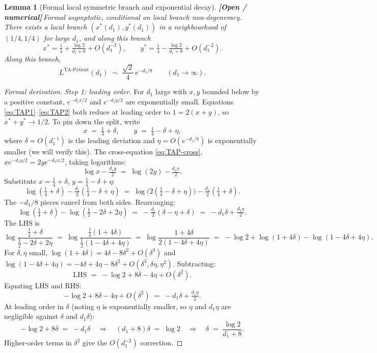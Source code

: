 \documentclass{article}
\theoremstyle{plain}
\newtheorem{lemma}{Lemma}
\theoremstyle{definition}
\newcommand{\open}{\textcolor{openred}{\textbf{[Open / numerical]}}\,}
\begin{document}
\begin{lemma}[Formal local symmetric branch and exponential decay]\label{lem:TAP}
\open Formal asymptotic, conditional on local branch non-degeneracy. There exists a local branch $(x^\ast(d_1),y^\ast(d_1))$ in a neighbourhood of $(1/4,1/4)$ for large $d_1$, and along this branch
\[
x^\ast=\tfrac14+\tfrac{\log 2}{d_1+8}+O(d_1^{-2}),\qquad y^\ast=\tfrac14-\tfrac{\log 2}{d_1+8}+O(d_1^{-2}).
\]
Along this branch,
\[
L^{\text{TA-Patient}}(d_1) \;\sim\; \frac{\sqrt 2}{4}\,e^{-d_1/8}\qquad(d_1\to\infty).
\]
\end{lemma}

\begin{proof}[Formal derivation]
\emph{Step 1: leading order.} For $d_1$ large with $x,y$ bounded below by a positive constant, $e^{-d_1 x/2}$ and $e^{-d_1 y/2}$ are exponentially small. Equations \eqref{eq:TAP1}--\eqref{eq:TAP2} both reduce at leading order to $1=2(x+y)$, so $x^\ast+y^\ast\to 1/2$. To pin down the split, write
\[
x\;=\;\tfrac14+\delta,\qquad y\;=\;\tfrac14-\delta+\eta,
\]
where $\delta=O(d_1^{-1})$ is the leading deviation and $\eta=O(e^{-d_1/8})$ is exponentially smaller (we will verify this). The cross-equation \eqref{eq:TAP-cross}, $x e^{-d_1 y/2}=2y e^{-d_1 x/2}$, taking logarithms:
\[
\log x-\tfrac{d_1 y}{2}\;=\;\log(2y)-\tfrac{d_1 x}{2}.
\]
Substitute $x=\tfrac14+\delta$, $y=\tfrac14-\delta+\eta$:
\[
\log(\tfrac14+\delta)-\tfrac{d_1}{2}(\tfrac14-\delta+\eta)\;=\;\log\bigl(2(\tfrac14-\delta+\eta)\bigr)-\tfrac{d_1}{2}(\tfrac14+\delta).
\]
The $-d_1/8$ pieces cancel from both sides. Rearranging:
\[
\log(\tfrac14+\delta)-\log(\tfrac12-2\delta+2\eta)\;=\;-\tfrac{d_1}{2}(\delta-\eta+\delta)\;=\;-d_1\delta+\tfrac{d_1\eta}{2}.
\]
The LHS is
\[
\log\!\frac{\tfrac14+\delta}{\tfrac12-2\delta+2\eta}\;=\;\log\!\frac{\tfrac14(1+4\delta)}{\tfrac12(1-4\delta+4\eta)}\;=\;\log\!\frac{1+4\delta}{2(1-4\delta+4\eta)}\;=\;-\log 2+\log(1+4\delta)-\log(1-4\delta+4\eta).
\]
For $\delta,\eta$ small, $\log(1+4\delta)=4\delta-8\delta^2+O(\delta^3)$ and $\log(1-4\delta+4\eta)=-4\delta+4\eta-8\delta^2+O(\delta^3,\delta\eta,\eta^2)$. Subtracting:
\[
\text{LHS}\;=\;-\log 2+8\delta-4\eta+O(\delta^2).
\]
Equating LHS and RHS:
\[
-\log 2+8\delta-4\eta+O(\delta^2)\;=\;-d_1\delta+\tfrac{d_1\eta}{2}.
\]
At leading order in $\delta$ (noting $\eta$ is exponentially smaller, so $\eta$ and $d_1\eta$ are negligible against $\delta$ and $d_1\delta$):
\[
-\log 2+8\delta\;=\;-d_1\delta\quad\Longrightarrow\quad (d_1+8)\delta\;=\;\log 2\quad\Longrightarrow\quad \delta\;=\;\frac{\log 2}{d_1+8}.
\]
Higher-order terms in $\delta^2$ give the $O(d_1^{-2})$ correction.


\end{proof}
\end{document}
